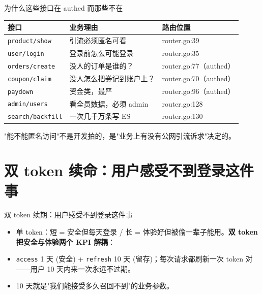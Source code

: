 \begin{frame}{为什么这些接口在 authed 而那些不在}
\begin{tabular}{@{}lll@{}}
\toprule
接口 & 业务理由 & 路由位置 \\
\midrule
\texttt{product/show}    & 引流必须匿名可看  & router.go:39 \\
\texttt{user/login}      & 登录前怎么可能登录 & router.go:35 \\
\texttt{orders/create}   & 没人的订单是谁的？ & router.go:77（authed） \\
\texttt{coupon/claim}    & 没人怎么把券记到账户上？& router.go:70（authed） \\
\texttt{paydown}         & 资金类，最严      & router.go:96（authed） \\
\texttt{admin/users}     & 看全员数据，必须 admin & router.go:128 \\
\texttt{search/backfill} & 一次几千万条写 ES & router.go:130 \\
\bottomrule
\end{tabular}
\vspace{2mm}
\small "能不能匿名访问"不是开发拍的，是"业务上有没有公网引流诉求"决定的。
\end{frame}

\section{双 token 续命：用户感受不到登录这件事}

\begin{frame}{双 token 续期：用户感受不到登录这件事}
\vspace{2mm}
\begin{itemize}
  \item 单 token：短 = 安全但每天登录 / 长 = 体验好但被偷一辈子能用。\textbf{双 token 把安全与体验两个 KPI 解耦}：
  \item \texttt{access} 1 天 (安全) + \texttt{refresh} 10 天 (留存)；每次请求都刷新一次 token 对——用户 10 天内来一次永远不过期。
  \item 10 天就是"我们能接受多久召回不到"的业务参数。
\end{itemize}
\end{frame}

